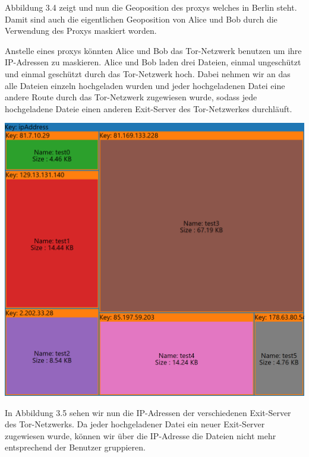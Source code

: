 \documentclass[
    fontsize=12pt,
    headings=small,
    parskip=half,           %
    bibliography=totoc,
    numbers=noenddot,       %
    open=any,               %
    ]{scrreprt}
\begin{document}
Abbildung 3.4 zeigt und nun die Geoposition des proxys welches in Berlin steht.
Damit sind auch die eigentlichen Geoposition von Alice und Bob durch die Verwendung des Proxys maskiert worden. 

Anstelle eines proxys könnten Alice und Bob das Tor-Netzwerk benutzen um ihre IP-Adressen zu maskieren. Alice und Bob laden drei Dateien, einmal ungeschützt und einmal geschützt durch das Tor-Netzwerk hoch.
Dabei nehmen wir an das alle Dateien einzeln hochgeladen wurden und jeder hochgeladenen Datei eine andere Route durch das Tor-Netzwerk zugewiesen wurde, sodass jede hochgeladene Dateie einen anderen Exit-Server des Tor-Netzwerkes durchläuft. 

\begin{center}
\includegraphics[width=\textwidth]{../pic/IP-Tor-SetB-tree2.png}\\
\end{center}

In Abbildung 3.5 sehen wir nun die IP-Adressen der verschiedenen Exit-Server des Tor-Netzwerks.
Da jeder hochgeladener Datei ein neuer Exit-Server zugewiesen wurde, können wir über die IP-Adresse die Dateien nicht mehr entsprechend der Benutzer gruppieren.
\end{document}
